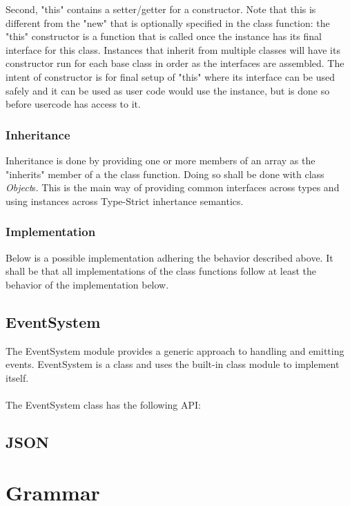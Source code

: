 \documentclass[12pt,letterpaper]{report}
\begin{document}
Second, "this" contains a setter/getter for a constructor. Note that this is different from 
the "new" that is optionally specified in the class function: the "this" constructor is a function 
that is called once the instance has its final interface for this class. Instances 
that inherit from multiple classes will have its constructor run for each base class in order as the interfaces are assembled.
The intent of constructor is for final setup of "this" where its interface can be used safely
and it can be used as user code would use the instance, but is done so before usercode has access 
to it.


\subsection{Inheritance}\label{Inheritance}

Inheritance is done by providing one or more members of an array as the "inherits" member 
of a the class function. Doing so shall be done with class \textit{Object}s. This is the main 
way of providing common interfaces across types and using instances across Type-Strict
inhertance semantics.




\subsection{Implementation}\label{Implementation}

Below is a possible implementation adhering the behavior described above. It shall be that 
all implementations of the class functions follow at least the behavior of the implementation below.




\section{EventSystem}\label{EventSystem}

The EventSystem module provides a generic approach to handling and emitting events. 
EventSystem is a class and uses the built-in class module to implement itself.
\\\\
The EventSystem class has the following API:
\begin{itemize}

\end{itemize}


\section{JSON}\label{JSON}
\chapter{Grammar}\label{Grammar}


\end{document}
